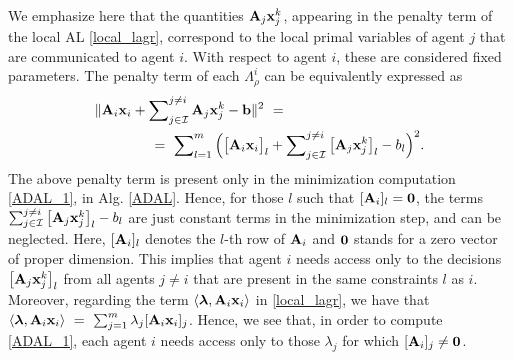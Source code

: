 \documentclass[doublecolumn]{IEEEtran}
\begin{document}
We emphasize here that the quantities ${\bf A}_j{ {\bf x} }_j^k$, appearing in the penalty term of the local AL \eqref{local_lagr}, correspond to the local primal variables of agent $j$ that are communicated to agent $i$. With respect to agent $i$, these are considered fixed parameters. The penalty term of each $\Lambda_{\rho}^i$ can be equivalently expressed as
\begin{align*}
&\| {\bf A}_i{ {\bf x} }_i + \sum\nolimits_{j\in\mathcal{I}}^{j\neq i} {\bf A}_j{ {\bf x} }_j^k - { {\bf b} } \|^2 ~= \\
&  \qquad\qquad =~ \sum\nolimits_{l=1}^m \Big(  \big[{\bf A}_i{ {\bf x} }_i\big]_l + \sum\nolimits_{j\in\mathcal{I}}^{j\neq i} \big[{\bf A}_j{ {\bf x} }_j^k\big]_l - b_l \Big)^2.
\end{align*}
The above penalty term is present only in the  minimization computation \eqref{ADAL_1}, in Alg. \ref{ADAL}. Hence, for those $l$ such that $[{\bf A}_i]_l = {\mathbf 0}$, the terms $\sum_{j\in\mathcal{I}}^{j\neq i} \big[{\bf A}_j{ {\bf x} }_j^k\big]_l -b_l$  are just constant terms in the minimization step, and can be neglected. Here, $[{\bf A}_i]_l$ denotes the $l$-th row of ${ {\bf A} }_i$  and ${\bf 0}$ stands for a zero vector of proper dimension. This implies that agent $i$ needs access only to the decisions $ \big[{\bf A}_j{ {\bf x} }_j^k\big]_l$ from all agents $j\neq i$ that are present in the same constraints $l$ as $i$. Moreover, regarding the term $\langle {\boldsymbol{\lambda}} ,{\bf A}_i{ {\bf x} }_i \rangle$ in \eqref{local_lagr}, we have that $\langle {\boldsymbol{\lambda}} ,{\bf A}_i{ {\bf x} }_i \rangle ~=~ \sum_{j=1}^m \lambda_j [{\bf A}_i{ {\bf x} }_i]_j$. Hence, we see that, in order to compute \eqref{ADAL_1}, each agent $i$ needs access only to those $\lambda_j$ for which $[{\bf A}_i]_j\neq {\mathbf 0}$.
\end{document}
